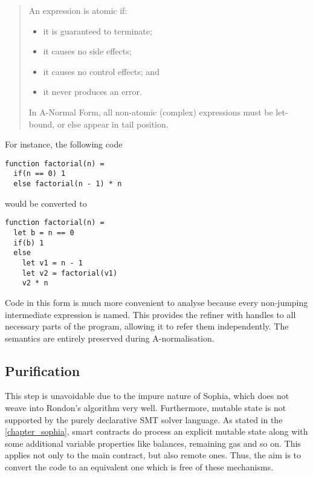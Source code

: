\begin{quote}
  \begin{defi}
    An expression is atomic if:

    \begin{itemize}
    \item it is guaranteed to terminate;
    \item it causes no side effects;
    \item it causes no control effects; and
    \item it never produces an error.
    \end{itemize}
  \end{defi}

  \begin{defi}
    In A-Normal Form, all non-atomic (complex) expressions must be let-bound, or
    else appear in tail position.
  \end{defi}
\end{quote}

For instance, the following code

\begin{minipage}{\linewidth}
\begin{lstlisting}[language=sophia]
function factorial(n) =
  if(n == 0) 1
  else factorial(n - 1) * n
\end{lstlisting}
\end{minipage}

would be converted to

\begin{minipage}{\linewidth}
\begin{lstlisting}[language=sophia]
function factorial(n) =
  let b = n == 0
  if(b) 1
  else
    let v1 = n - 1
    let v2 = factorial(v1)
    v2 * n
\end{lstlisting}
\end{minipage}

Code in this form is much more convenient to analyse because every non-jumping
intermediate expression is named. This provides the refiner with handles to all
necessary parts of the program, allowing it to refer them independently. The
semantics are entirely preserved during A-normalisation.

\subsection{Purification}

This step is unavoidable due to the impure nature of Sophia, which does not
weave into Rondon's algorithm very well. Furthermore, mutable state is not
supported by the purely declarative SMT solver language. As stated in the
\autoref{chapter_sophia}, smart contracts do process an explicit mutable state
along with some additional variable properties like balances, remaining gas and
so on. This applies not only to the main contract, but also remote ones. Thus,
the aim is to convert the code to an equivalent one which is free of these
mechanisms.

